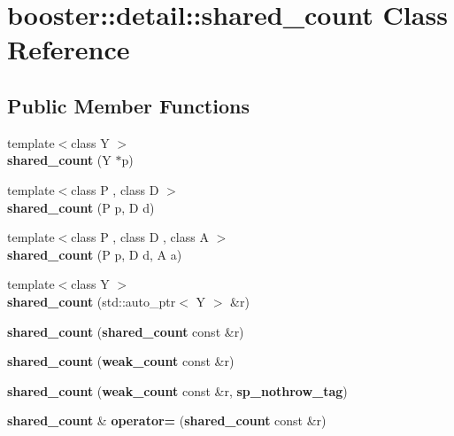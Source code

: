 \section{booster\+:\+:detail\+:\+:shared\+\_\+count Class Reference}
\label{classbooster_1_1detail_1_1shared__count}
\subsection*{Public Member Functions}
\begin{DoxyCompactItemize}
\item 
{\footnotesize template$<$class Y $>$ }\\{\bfseries shared\+\_\+count} (Y $\ast$p)\label{classbooster_1_1detail_1_1shared__count_a4ce5c246ea8c1bd5af70f348b30c2d22}

\item 
{\footnotesize template$<$class P , class D $>$ }\\{\bfseries shared\+\_\+count} (P p, D d)\label{classbooster_1_1detail_1_1shared__count_a8f9da198bb47c5e4b2b3b6a4561ab9e8}

\item 
{\footnotesize template$<$class P , class D , class A $>$ }\\{\bfseries shared\+\_\+count} (P p, D d, A a)\label{classbooster_1_1detail_1_1shared__count_abaf623b57b2781e8aa61e4a42f74bf33}

\item 
{\footnotesize template$<$class Y $>$ }\\{\bfseries shared\+\_\+count} (std\+::auto\+\_\+ptr$<$ Y $>$ \&r)\label{classbooster_1_1detail_1_1shared__count_a2c6839fce2332dd54223625c5359b443}

\item 
{\bfseries shared\+\_\+count} ({\bf shared\+\_\+count} const \&r)\label{classbooster_1_1detail_1_1shared__count_aef86aa9561b40e8a5577960f8fb9e718}

\item 
{\bfseries shared\+\_\+count} ({\bf weak\+\_\+count} const \&r)\label{classbooster_1_1detail_1_1shared__count_a7ec7df6edb6c6dba29b4844151ebc696}

\item 
{\bfseries shared\+\_\+count} ({\bf weak\+\_\+count} const \&r, {\bf sp\+\_\+nothrow\+\_\+tag})\label{classbooster_1_1detail_1_1shared__count_a7cecf7e90b810ab6ca77948c760ca395}

\item 
{\bf shared\+\_\+count} \& {\bfseries operator=} ({\bf shared\+\_\+count} const \&r)\label{classbooster_1_1detail_1_1shared__count_ab0fcc7b8bf85f16f55f121b292bf0d23}


\end{DoxyCompactItemize}

